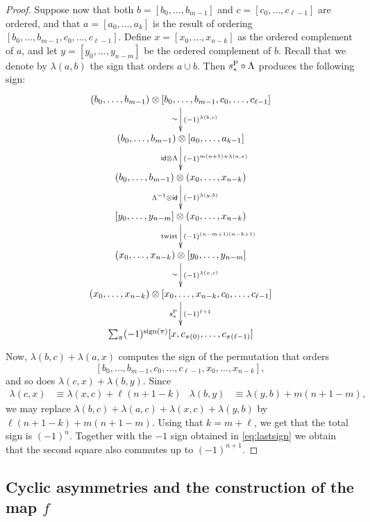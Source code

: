 \begin{proof}
	Suppose now that both $b=[b_0,\ldots,b_{m-1}]$ and $c=[c_0,\ldots,c_{\ell-1}]$ are ordered, and that $a = [a_0,\ldots,a_k]$ is the result of ordering $[b_0,\ldots,b_{m-1},c_0,\ldots,c_{\ell-1}]$. Define $x=[x_0,\ldots,x_{n-k}]$ as the ordered complement of $a$, and let $y=[y_0,\ldots,y_{n-m}]$ be the ordered complement of $b$. Recall that we denote by $\lambda(a,b)$ the sign that orders $a\cup b$. Then $s_*^{\operatorname{P}}\circ \Lambda$ produces the following sign:
	\[
	\xymatrix{
	(b_0,\ldots,b_{m-1})\otimes [b_0,\ldots,b_{m-1},c_0,\ldots,c_{\ell-1}]
	\ar[d]^-{(-1)^{\lambda(b,c)}}_-{\sim} 
	\\
	(b_0,\ldots,b_{m-1})\otimes [a_0,\ldots,a_{k-1}] 
	\ar[d]^{(-1)^{m(n+1)+\lambda(a,x)}}_{\id\otimes \Lambda} 
	\\
	(b_0,\ldots,b_{m-1})\otimes (x_0,\ldots,x_{n-k})
	\ar[d]^-{(-1)^{\lambda(y,b)}}_-{\Lambda^{-1}\otimes \id}
	\\
	[y_0,\ldots,y_{n-m}]\otimes (x_0,\ldots,x_{n-k})
	\ar[d]^-{(-1)^{(n-m+1)(n-k+1)}}_-{\twist}
	\\
	(x_0,\ldots,x_{n-k})\otimes [y_0,\ldots,y_{n-m}]
	\ar[d]^-{(-1)^{\lambda(x,c)}}_-{\sim}
	\\
	(x_0,\ldots,x_{n-k})\otimes [x_0,\ldots,x_{n-k},c_0,\ldots,c_{\ell-1}]
	\ar[d]^-{(-1)^{\ell+1}}_-{s_*^{\Psd}}
	\\
	\sum_{\perm} (-1)^{\sign{\perm}}[x,c_{\perm(0)},\ldots,c_{\perm(\ell-1)}]
	}
	\]
	Now, $\lambda(b,c) + \lambda(a,x)$ computes the sign of the permutation that orders 
	\[
		[b_0,\ldots,b_{m-1},c_0,\ldots,c_{\ell-1},x_{0},\ldots,x_{n-k}],
	\]
	and so does $\lambda(c,x)+\lambda(b,y)$. Since
	\begin{align*}
	\lambda(c,x) &\equiv \lambda(x,c) + \ell(n+1-k)
	&
	\lambda(b,y) &\equiv \lambda(y,b) + m(n+1-m),
	\end{align*}
	we may replace $\lambda(b,c)+\lambda(a,c) + \lambda(x,c) + \lambda(y,b)$ by $\ell(n+1-k)+m(n+1-m)$. Using that $k=m+\ell$, we get that the total sign is $(-1)^{n}$. Together with the $-1$ sign obtained in \eqref{eq:lastsign} we obtain that the second square also commutes up to $(-1)^{n+1}$.
\end{proof}

\subsection{Cyclic asymmetries and the construction of the map \texorpdfstring{$f$}{f}}

